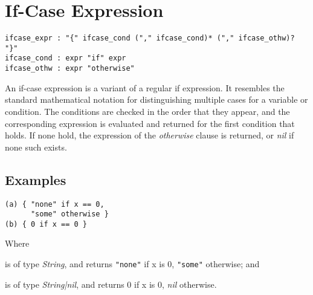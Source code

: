 \section{If-Case Expression}

\begin{verbatim}
ifcase_expr : "{" ifcase_cond ("," ifcase_cond)* ("," ifcase_othw)? "}"
ifcase_cond : expr "if" expr
ifcase_othw : expr "otherwise"
\end{verbatim}

An if-case expression is a variant of a regular if expression. It resembles the
standard mathematical notation for distinguishing multiple cases for a variable
or condition. The conditions are checked in the order that they appear, and the
corresponding expression is evaluated and returned for the first condition that
holds. If none hold, the expression of the \emph{otherwise} clause is returned,
or \emph{nil} if none such exists.

\subsection{Examples}

\begin{verbatim}
(a) { "none" if x == 0,
      "some" otherwise }
(b) { 0 if x == 0 }
\end{verbatim}

Where \begin{exdesc}
\item is of type \emph{String}, and returns \verb|"none"| if x is 0,
      \verb|"some"| otherwise; and
\item is of type \emph{String|nil}, and returns 0 if x is 0, \emph{nil}
      otherwise.
\end{exdesc}
